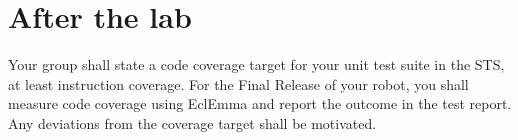 \documentclass{scrreprt}
\begin{document}
\chapter{After the lab}
Your group shall state a code coverage target for your unit test suite in the STS, at least instruction coverage. For the Final Release of your robot, you shall measure code coverage using EclEmma and report the outcome in the test report. Any deviations from the coverage target shall be motivated.
\end{document}
